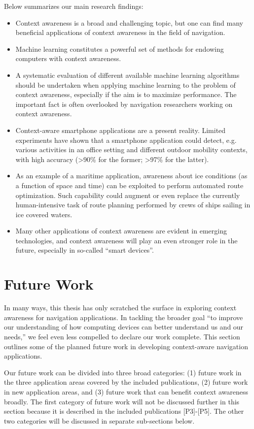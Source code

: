 Below summarizes our main research findings:
%
\begin{itemize}
\item Context awareness is a broad and challenging topic, but one can find many beneficial applications of context awareness in the field of navigation.
\item Machine learning constitutes a powerful set of methods for endowing computers with context awareness.
\item A systematic evaluation of different available machine learning algorithms should be undertaken when applying machine learning to the problem of context awareness, especially if the aim is to maximize performance. The important fact is often overlooked by navigation researchers working on context awareness.
\item Context-aware smartphone applications are a present reality. Limited experiments have shown that a smartphone application could detect, e.g. various activities in an office setting and different outdoor mobility contexts, with high accuracy (\textgreater90\% for the former; \textgreater97\% for the latter).
\item As an example of a maritime application, awareness about ice conditions (as a function of space and time) can be exploited to perform automated route optimization. Such capability could augment or even replace the currently human-intensive task of route planning performed by crews of ships sailing in ice covered waters.
\item Many other applications of context awareness are evident in emerging technologies, and context awareness will play an even stronger role in the future, especially in so-called ``smart devices''.

\end{itemize}

\section{Future Work}
\label{sec:future_work}

In many ways, this thesis has only scratched the surface in exploring context awareness for navigation applications. In tackling the broader goal ``to improve our understanding of how computing devices can better understand us and our needs,'' we feel even less compelled to declare our work complete. This section outlines some of the planned future work in developing context-aware navigation applications.

Our future work can be divided into three broad categories: (1) future work in the three application areas covered by the included publications, (2) future work in new application areas, and (3) future work that can benefit context awareness broadly. The first category of future work will not be discussed further in this section because it is described in the included publications [P3]-[P5]. The other two categories will be discussed in separate sub-sections below.

